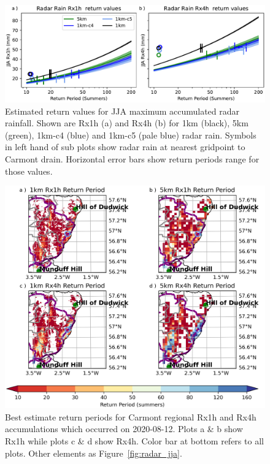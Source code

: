 \documentclass[11pt,a4paper]{article}
\begin{document}
\begin{figure}
	\centering
	\includegraphics[width=\linewidth]{radar_return_prds}
	\caption{Estimated return values for  JJA maximum accumulated radar rainfall. Shown are Rx1h (a) and Rx4h (b) for 1km  (black),  5km (green), 1km-c4 (blue) and 1km-c5 (pale blue) radar rain. Symbols in left hand of sub plots show radar rain at nearest gridpoint to Carmont drain. Horizontal error bars show return periods range for those values. }
	\label{fig:radar_rtn_prd}
\end{figure}

\begin{figure}
	\centering
	\includegraphics[width=\linewidth]{map_return_prds}
	\caption{Best estimate return periods for Carmont regional Rx1h and Rx4h accumulations which occurred on 2020-08-12. Plots a \& b show Rx1h while plots c \& d show Rx4h. Color bar at bottom refers to all plots. Other elements as Figure~\ref{fig:radar_jja}. } 
	\label{fig:map_rtn_prd}
\end{figure}
\end{document}
